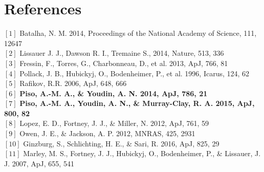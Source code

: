 \documentclass[12pt, letterpaper]{article}
\begin{document}
\section*{References}
\footnotesize
\noindent $[1]$ Batalha, N. M. 2014, Proceedings of the National Academy of Science, 111, 12647 \\
$[2]$ Lissauer J. J., Dawson R. I., Tremaine S., 2014, Nature, 513, 336 \\
$[3]$ Fressin, F., Torres, G., Charbonneau, D., et al. 2013, ApJ, 766, 81\\
$[4]$ Pollack, J. B., Hubickyj, O., Bodenheimer, P., et al. 1996, Icarus, 124, 62 \\
$[5]$ Rafikov, R.R. 2006, ApJ, 648, 666 \\
$[6]$ \textbf{Piso, A.-M. A., \& Youdin, A. N. 2014, ApJ, 786, 21} \\
$[7]$ \textbf{Piso, A.-M. A., Youdin, A. N., \& Murray-Clay, R. A. 2015, ApJ, 800, 82} \\
$[8]$ Lopez, E. D., Fortney, J. J., \& Miller, N. 2012, ApJ, 761, 59 \\
$[9]$ Owen, J. E., \& Jackson, A. P. 2012, MNRAS, 425, 2931 \\
$[10]$ Ginzburg, S., Schlichting, H. E., \& Sari, R. 2016, ApJ, 825, 29 \\
$[11]$ Marley, M. S., Fortney, J. J., Hubickyj, O., Bodenheimer, P., \& Lissauer, J. J. 2007, ApJ, 655, 541




%
%


\end{document}

